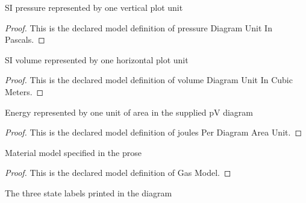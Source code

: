 \begin{definition}
  \label{def:physics:phyx-mini-0358:phyxminiproblems-problemphyxmini0358-pressurediagramunitinpascals}
  SI pressure represented by one vertical plot unit
\end{definition}
\begin{proof}
  This is the declared model definition of pressure Diagram Unit In Pascals.
\end{proof}
\begin{definition}
  \label{def:physics:phyx-mini-0358:phyxminiproblems-problemphyxmini0358-volumediagramunitincubicmeters}
  SI volume represented by one horizontal plot unit
\end{definition}
\begin{proof}
  This is the declared model definition of volume Diagram Unit In Cubic Meters.
\end{proof}
\begin{definition}
  \label{def:physics:phyx-mini-0358:phyxminiproblems-problemphyxmini0358-joulesperdiagramareaunit}
  Energy represented by one unit of area in the supplied pV diagram
\end{definition}
\begin{proof}
  This is the declared model definition of joules Per Diagram Area Unit.
\end{proof}
\begin{definition}
  \label{def:physics:phyx-mini-0358:phyxminiproblems-problemphyxmini0358-gasmodel}
  Material model specified in the prose
\end{definition}
\begin{proof}
  This is the declared model definition of Gas Model.
\end{proof}
\begin{definition}
  \label{def:physics:phyx-mini-0358:phyxminiproblems-problemphyxmini0358-pvdiagramstate}
  The three state labels printed in the diagram
\end{definition}

